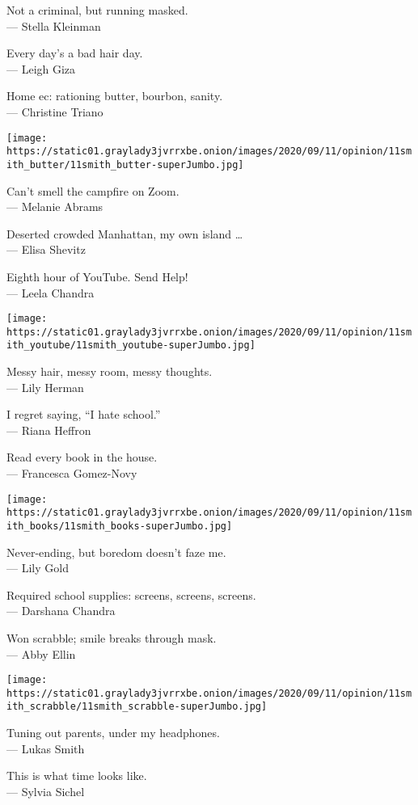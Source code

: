 Not a criminal, but running masked.\\
--- Stella Kleinman

Every day's a bad hair day.\\
--- Leigh Giza

Home ec: rationing butter, bourbon, sanity.\\
--- Christine Triano

\texttt{[image: https://static01.graylady3jvrrxbe.onion/images/2020/09/11/opinion/11smith\_butter/11smith\_butter-superJumbo.jpg]}

Can't smell the campfire on Zoom.\\
--- Melanie Abrams

Deserted crowded Manhattan, my own island \ldots{}\\
--- Elisa Shevitz

Eighth hour of YouTube. Send Help!\\
--- Leela Chandra

\texttt{[image: https://static01.graylady3jvrrxbe.onion/images/2020/09/11/opinion/11smith\_youtube/11smith\_youtube-superJumbo.jpg]}

Messy hair, messy room, messy thoughts.\\
--- Lily Herman

I regret saying, ``I hate school.''\\
--- Riana Heffron

Read every book in the house.\\
--- Francesca Gomez-Novy

\texttt{[image: https://static01.graylady3jvrrxbe.onion/images/2020/09/11/opinion/11smith\_books/11smith\_books-superJumbo.jpg]}

Never-ending, but boredom doesn't faze me.\\
--- Lily Gold

Required school supplies: screens, screens, screens.\\
--- Darshana Chandra

Won scrabble; smile breaks through mask.\\
--- Abby Ellin

\texttt{[image: https://static01.graylady3jvrrxbe.onion/images/2020/09/11/opinion/11smith\_scrabble/11smith\_scrabble-superJumbo.jpg]}

Tuning out parents, under my headphones.\\
--- Lukas Smith

This is what time looks like.\\
--- Sylvia Sichel


